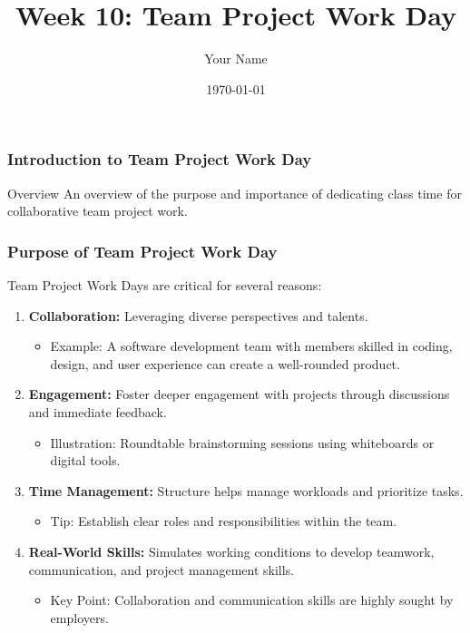 \documentclass{beamer}
\title{Week 10: Team Project Work Day}
\author{Your Name}
\institute{Your Institution}
\date{\today}
\begin{document}
\frame{\titlepage}

\begin{frame}[fragile]
    \frametitle{Introduction to Team Project Work Day}
    \begin{block}{Overview}
        An overview of the purpose and importance of dedicating class time for collaborative team project work.
    \end{block}
\end{frame}

\begin{frame}[fragile]
    \frametitle{Purpose of Team Project Work Day}
    Team Project Work Days are critical for several reasons:
    \begin{enumerate}
        \item \textbf{Collaboration:} Leveraging diverse perspectives and talents.
            \begin{itemize}
                \item Example: A software development team with members skilled in coding, design, and user experience can create a well-rounded product.
            \end{itemize}
        
        \item \textbf{Engagement:} Foster deeper engagement with projects through discussions and immediate feedback.
            \begin{itemize}
                \item Illustration: Roundtable brainstorming sessions using whiteboards or digital tools.
            \end{itemize}

        \item \textbf{Time Management:} Structure helps manage workloads and prioritize tasks.
            \begin{itemize}
                \item Tip: Establish clear roles and responsibilities within the team.
            \end{itemize}

        \item \textbf{Real-World Skills:} Simulates working conditions to develop teamwork, communication, and project management skills.
            \begin{itemize}
                \item Key Point: Collaboration and communication skills are highly sought by employers.
            \end{itemize}
    \end{enumerate}
\end{frame}
\end{document}

